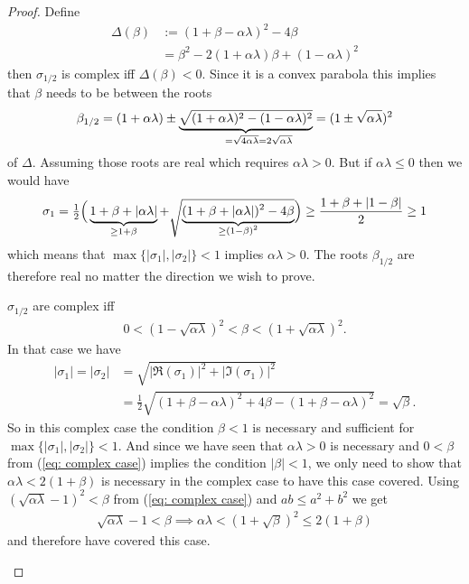 \begin{proof}
	Define
	\begin{align*}
		\Delta(\beta)
		&:= (1+\beta-\alpha\lambda)^2 - 4\beta\\
		&= \beta^2 - 2(1+\alpha\lambda)\beta + (1-\alpha\lambda)^2
	\end{align*}
	then \(\sigma_{1/2}\) is complex iff \(\Delta(\beta)<0\). Since it is a
	convex parabola this implies that \(\beta\) needs to be between the roots
	\begin{align*}
		\beta_{1/2}
		= (1+\alpha\lambda) \pm 
		\underbrace{
			\sqrt{(1+\alpha\lambda)^2 - (1-\alpha\lambda)^2}
		}_{=\sqrt{4\alpha\lambda}=\mathrlap{2\sqrt{\alpha\lambda}}}
		= (1\pm \sqrt{\alpha\lambda})^2	
	\end{align*}
	of \(\Delta\). Assuming those roots are real which requires \(\alpha\lambda>0\).
	But if \(\alpha\lambda\le0\) then we would have
	\begin{align*}
		\sigma_1
		= \tfrac12 \Big(
			\underbrace{1+\beta+|\alpha\lambda|}_{\ge 1+\beta}
			+ \sqrt{\underbrace{(1+\beta+|\alpha\lambda|)^2 - 4\beta}_{\smash{\ge (1-\beta)^2}}}
		\Big)
		\ge \frac{1+\beta + |1-\beta|}2 \ge 1
	\end{align*}
	which means that \(\max\{|\sigma_1|,|\sigma_2|\}<1\) implies \(\alpha\lambda>0\).
	The roots \(\beta_{1/2}\) are therefore real no matter the direction we
	wish to prove.
	\begin{description}[wide, labelindent=0pt]
	\item[Complex Case:]
		\(\sigma_{1/2}\) are complex iff	
		\begin{align}\label{eq: complex case}
			0 < (1-\sqrt{\alpha\lambda})^2 < \beta < (1+\sqrt{\alpha\lambda})^2.
		\end{align}
		In that case we have
		\begin{align*}
			|\sigma_1| = |\sigma_2|
			&= \sqrt{|\Re(\sigma_1)|^2 + |\Im(\sigma_1)|^2}\\
			&= \tfrac12 \sqrt{(1+\beta-\alpha\lambda)^2 + 4\beta - (1+\beta-\alpha\lambda)^2}
			= \sqrt{\beta}.
		\end{align*}
		So in this complex case the condition
		\(\beta<1\) is necessary and sufficient for \(\max\{|\sigma_1|,|\sigma_2|\}<1\).
		And since we have seen that \(\alpha\lambda>0\) is necessary and \(0<\beta\)
		from (\ref{eq: complex case}) implies the condition \(|\beta|<1\), we only
		need to show that \(\alpha\lambda <2(1+\beta)\) is necessary in the complex
		case to have this case covered. Using \((\sqrt{\alpha\lambda}-1)^2 < \beta\)
		from (\ref{eq: complex case}) and \(ab \le a^2 + b^2\) we get
		\begin{align*}
			\sqrt{\alpha\lambda} - 1
			< \beta \implies \alpha\lambda < (1+\sqrt{\beta})^2
			\le 2(1+\beta)
		\end{align*}
		and therefore have covered this case.


\end{description}
\end{proof}
